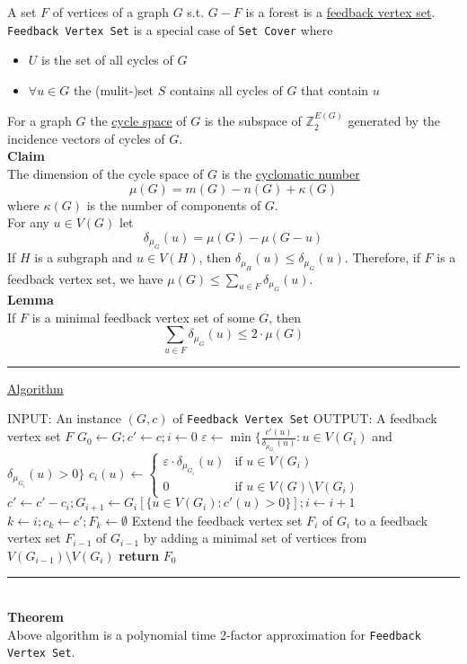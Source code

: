 \documentclass[a4paper, 12pt]{article}
\begin{document}
	A set $F$ of vertices of a graph $G$ s.t. $G-F$ is a forest is a \underline{feedback vertex set}. \texttt{Feedback Vertex Set} is a special case of \texttt{Set Cover} where \begin{itemize}
		\item $U$ is the set of all cycles of $G$
		\item $\forall u \in G$ the (mulit-)set $S$ contains all cycles of $G$ that contain $u$
	\end{itemize}
	For a graph $G$ the \underline{cycle space} of $G$ is the subspace of $\mathbb{Z}_2^{E(G)}$ generated by the incidence vectors of cycles of $G$.\\
	\textbf{Claim}\\
	The dimension of the cycle space of $G$ is the \underline{cyclomatic number} \[\mu(G) = m(G) - n(G) + \kappa(G)\] where $\kappa(G)$ is the number of components of $G$.\\
	
	For any $u \in V(G)$ let \[\delta_{\mu_G} (u) = \mu(G) - \mu(G-u)\]
	If $H$ is a subgraph and $u \in V(H)$, then $\delta_{\mu_H}(u) \leq \delta_{\mu_G}(u)$. Therefore, if $F$ is a feedback vertex set, we have $\mu(G) \leq \sum_{u \in F}\delta_{\mu_G}(u)$.\\
	\textbf{Lemma}\\
	If $F$ is a minimal feedback vertex set of some $G$, then \[\sum_{u \in F} \delta_{\mu_G}(u) \leq 2\cdot \mu(G)\]
	\par\noindent\rule{\textwidth}{0.4pt}
	\underline{Algorithm}
	\begin{algorithmic}
		\State INPUT: An instance $(G,c)$ of \texttt{Feedback Vertex Set} 
		\State OUTPUT: A feedback vertex set $F$
		\State $G_0 \gets G; c' \gets c; i \gets 0$
		\State $\varepsilon \gets \min\{\frac{c'(u)}{\delta_{\mu_{G_i}}(u)}: u \in V(G_i)$ and $\delta_{\mu_{G_i}}(u) > 0\}$
		\State $c_i(u) \gets \begin{cases}
			\varepsilon \cdot \delta_{\mu_{G_i}}(u) & \text{if } u \in V(G_i)\\
			0 & \text{if } u \in V(G) \setminus V(G_i)
		\end{cases}$
	\State $c' \gets c' - c_i; G_{i+1} \gets G_i[\{u \in V(G_i): c'(u) > 0\}]; i \gets i+1$
	\EndWhile
	\State $k \gets i; c_k \gets c'; F_k \gets \emptyset$
	\State Extend the feedback vertex set $F_i$ of $G_i$ to a feedback vertex set $F_{i-1}$ of $G_{i-1}$ by \indent adding a minimal set of vertices from $V(G_{i-1})\setminus V(G_i)$
	\EndFor
	\State \textbf{return} $F_0$
	\end{algorithmic}
	\par\noindent\rule{\textwidth}{0.4pt}\\
	
	\noindent\textbf{Theorem}\\
	Above algorithm is a polynomial time 2-factor approximation for \texttt{Feedback Vertex Set}.
\end{document}
